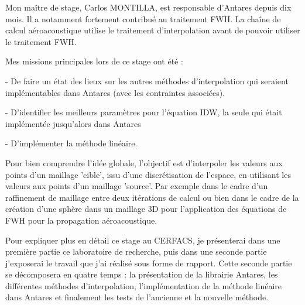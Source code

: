 Mon maître de stage, Carlos MONTILLA, est responsable d'Antares depuis dix mois. Il a notamment fortement contribué au traitement \ac{FWH}. La chaîne de calcul aéroacoustique utilise le traitement d'interpolation avant de pouvoir utiliser le traitement FWH.

Mes missions principales lors de ce stage ont été :

- De faire un état des lieux sur les autres méthodes d'interpolation qui seraient 
implémentables dans Antares (avec les contraintes associées).

- D'identifier les meilleurs paramètres pour l'équation \ac{IDW}, la seule qui était implémentée jusqu'alors dans Antares %

- D'implémenter la méthode linéaire.  %

\vspace{0,5cm}

Pour bien comprendre l'idée globale, l'objectif est d'interpoler les valeurs aux points d'un maillage 'cible', issu d'une discrétisation de l'espace, en utilisant les valeurs aux points d'un maillage 'source'.
Par exemple dans le cadre d'un raffinement de maillage entre deux itérations de calcul ou bien dans le cadre de la création d'une sphère dans un maillage 3D pour l'application des équations de FWH pour la propagation aéroacoustique.

\vspace{0,5cm}

Pour expliquer plus en détail ce stage au CERFACS, je présenterai dans une première partie ce laboratoire de recherche, puis dans une seconde partie j'exposerai le travail que j'ai réalisé sous forme de rapport. Cette seconde partie se décomposera en quatre temps : la présentation de la librairie Antares, les différentes méthodes d'interpolation, l'implémentation de la méthode linéaire dans Antares et finalement les tests de l'ancienne et la nouvelle méthode.